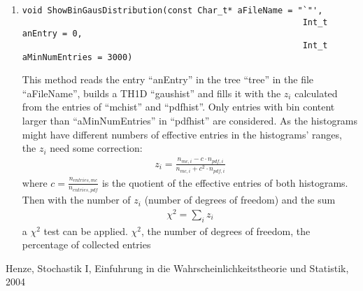 \documentclass[10pt, a4paper]{article}
\begin{document}
\begin{enumerate}
\begin{quote}
\end{quote}
\item
\begin{verbatim}
void ShowBinGausDistribution(const Char_t* aFileName = "`"',
														Int_t anEntry = 0,
														Int_t aMinNumEntries = 3000)
\end{verbatim}
This method reads the entry "`anEntry"' in the tree "`tree"' in the file "`aFileName"', builds a TH1D "`gaushist"' and fills it with the $z_i$ calculated from the entries of "`mchist"' and "`pdfhist"'. Only entries with bin content larger than "`aMinNumEntries"' in "`pdfhist"' are considered. As the histograms might have different numbers of effective entries in the histograms' ranges, the $z_i$ need some correction:
\begin{gather}
z_i = \frac{n_{mc,i} - c \cdot n_{pdf,i}}{n_{mc,i} + c^2 \cdot n_{pdf,i}}
\end{gather} 
where $c = \frac{n_{entries,mc}}{n_{entries,pdf}}$ is the quotient of the effective entries of both histograms.
Then with the number of $z_i$ (number of degrees of freedom) and the sum
\begin{gather}
\chi^2 = \sum_i z_i
\end{gather}
a $\chi^2$ test can be applied.
$\chi^2$, the number of degrees of freedom, the percentage of collected entries 

\end{enumerate}









\begin{thebibliography}{1cm}
 Henze, Stochastik I, Einfuhrung in die Wahrscheinlichkeitstheorie und Statistik, 2004
\end{thebibliography}
\end{document}
